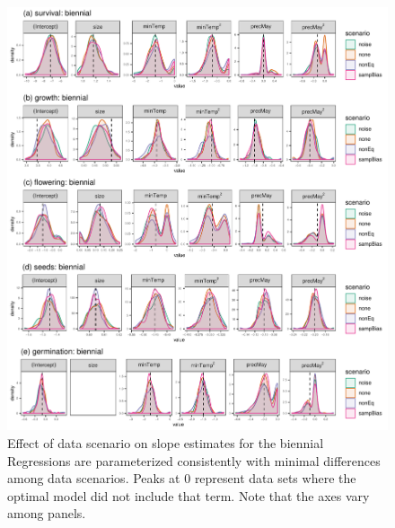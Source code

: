 \documentclass[]{article}
\begin{document}
\begin{figure}
    \centering\includegraphics[width=\linewidth]{../../figs/diag/slope_dens_biennial.pdf}
    \caption{\label{fig:slopesBiennial} Effect of data scenario on slope estimates for the biennial Regressions are parameterized consistently with minimal differences among data scenarios. Peaks at 0 represent data sets where the optimal model did not include that term. Note that the axes vary among panels.}
\end{figure}
\end{document}
